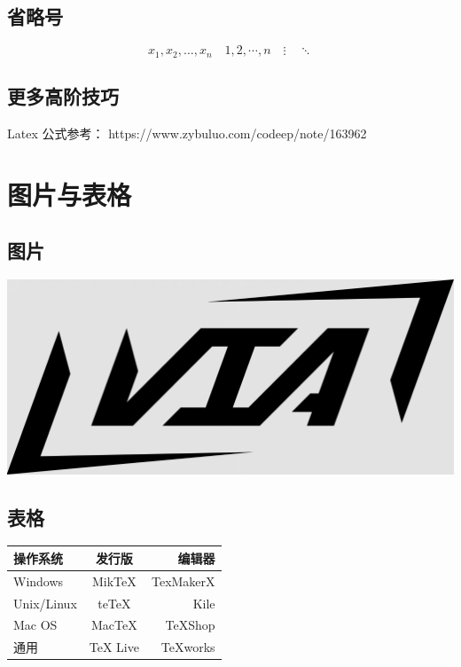\documentclass[UTF8]{ctexart}
\begin{document}
\subsection{省略号}

\[ x_1,x_2,\dots ,x_n\quad 1,2,\cdots ,n\quad
    \vdots\quad \ddots \]

\subsection{更多高阶技巧}

Latex 公式参考： https://www.zybuluo.com/codeep/note/163962

\section{图片与表格}

\subsection{图片}

\includegraphics[width = .9\textwidth]{assets/pic/Lviat Logo.png}

\subsection{表格}

\begin{tabular}{|l|c|r|}
    \hline
    操作系统   & 发行版   & 编辑器    \\
    \hline
    Windows    & MikTeX   & TexMakerX \\
    \hline
    Unix/Linux & teTeX    & Kile      \\
    \hline
    Mac OS     & MacTeX   & TeXShop   \\
    \hline
    通用       & TeX Live & TeXworks  \\
    \hline
\end{tabular}
\end{document}
